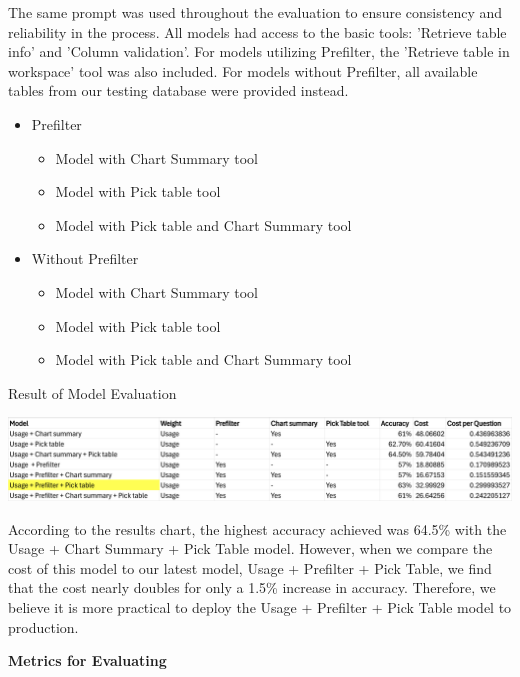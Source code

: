     The same prompt was used throughout the evaluation to ensure consistency and reliability in the process. All models had access to the basic tools: 'Retrieve table info' and 'Column validation'. For models utilizing Prefilter, the 'Retrieve table in workspace' tool was also included. For models without Prefilter, all available tables from our testing database were provided instead.
    \begin{itemize}
        \item Prefilter
        \begin{itemize}
            \item Model with Chart Summary tool 
            \item Model with Pick table tool
            \item Model with Pick table and Chart Summary tool
        \end{itemize}
        \item Without Prefilter
        \begin{itemize}
            \item Model with Chart Summary tool 
            \item Model with Pick table tool
            \item Model with Pick table and Chart Summary tool
        \end{itemize}
    \end{itemize}
    \begin{table}[H]
        \centering
        \caption[Result of Model Evaluation]{Result of Model Evaluation}
        \label{fig:generate_result}
        \includegraphics[width=17cm]{chapters/4/figures/generate_result.png}
    \end{table}
    According to the results chart, the highest accuracy achieved was 64.5\% with the Usage + Chart Summary + Pick Table model. However, when we compare the cost of this model to our latest model, Usage + Prefilter + Pick Table, we find that the cost nearly doubles for only a 1.5\% increase in accuracy. Therefore, we believe it is more practical to deploy the Usage + Prefilter + Pick Table model to production.
    \vspace{0.5cm}

    
    \textbf{Metrics for Evaluating}


